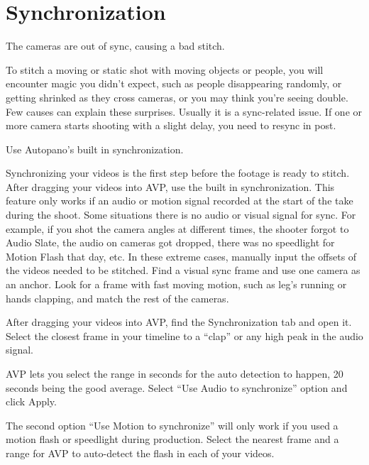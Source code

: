 \chapter{Synchronization}
\pagecolor{white}
\label{chap:33}
\begin{fullwidth}


\problem

{\large The cameras are out of sync, causing a bad stitch. \par}

To stitch a moving or static shot with moving objects or people, you will encounter magic you didn’t expect, such as people disappearing randomly, or getting shrinked as they cross cameras, or you may think you’re seeing double. Few causes can explain these surprises. Usually it is a sync-related issue. If one or more camera starts shooting with a slight delay, you need to resync in post.


\solutions

{\large Use Autopano’s built in synchronization. \par}

Synchronizing your videos is the first step before the footage is ready to stitch. After dragging your videos into AVP, use the built in synchronization. This feature only works if an audio or motion signal recorded at the start of the take during the shoot. Some situations there is no audio or visual signal for sync. For example, if you shot the camera angles at different times, the shooter forgot to Audio Slate, the audio on cameras got dropped, there was no speedlight for Motion Flash that day, etc. In these extreme cases, manually input the offsets of the videos needed to be stitched. Find a visual sync frame and use one camera as an anchor. Look for a frame with fast moving motion, such as leg’s running or hands clapping, and match the rest of the cameras.

After dragging your videos into AVP, find the Synchronization tab and open it. Select the closest frame in your timeline to a “clap” or any high peak in the audio signal. 

AVP lets you select the range in seconds for the auto detection to happen, 20 seconds being the good average. Select “Use Audio to synchronize” option and click Apply.


The second option “Use Motion to synchronize” will only work if you used a motion flash or speedlight during production. Select the nearest frame and a range for AVP to auto-detect the flash in each of your videos.



\end{fullwidth}
